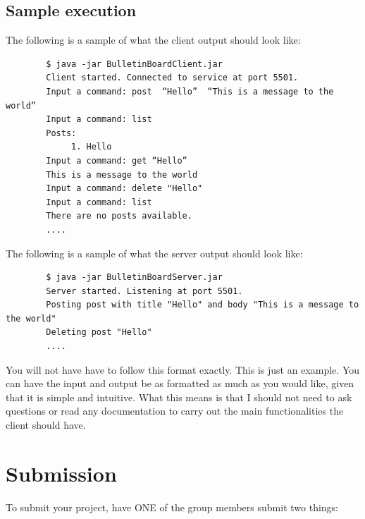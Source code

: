 \documentclass{article}
\begin{document}
\subsection*{Sample execution}
The following is a sample of what the client output should look like:
\begin{commandline}
	\begin{verbatim}
		$ java -jar BulletinBoardClient.jar
		Client started. Connected to service at port 5501.
		Input a command: post  “Hello”  “This is a message to the world”
		Input a command: list
		Posts:
		     1. Hello
		Input a command: get “Hello”
		This is a message to the world
		Input a command: delete "Hello"
		Input a command: list
		There are no posts available.
		....
	\end{verbatim}
\end{commandline}
The following is a sample of what the server output should look like:
\begin{commandline}
	\begin{verbatim}
		$ java -jar BulletinBoardServer.jar
		Server started. Listening at port 5501.
		Posting post with title "Hello" and body "This is a message to the world"
		Deleting post "Hello"
		....
	\end{verbatim}
\end{commandline}
You will not have have to follow this format exactly. This is just an example. You can have the input and output be as formatted as much as you would like, given that it is simple and intuitive. What this means is that I should not need to ask questions or read any documentation to carry out the main functionalities the client should have.  




\section{Submission } %
To submit your project, have ONE of the group members submit two things:
\end{document}
